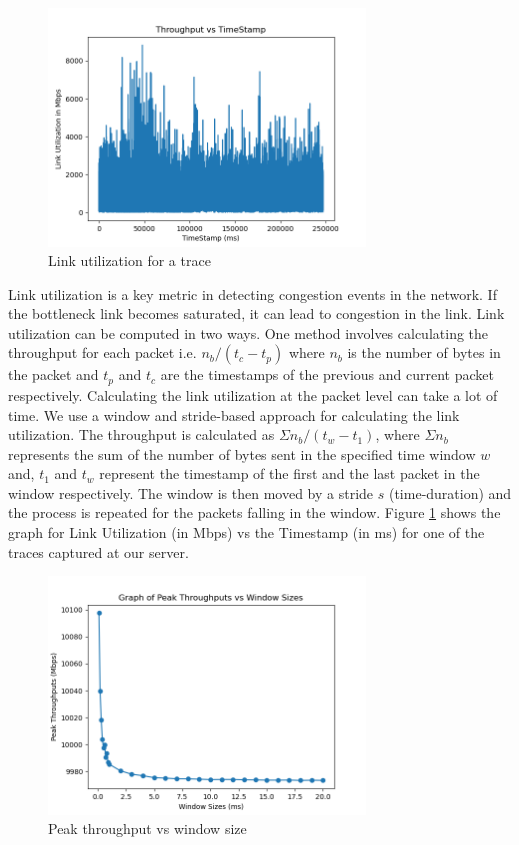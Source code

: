 \begin{figure}[t]
    \centering
        \includegraphics[width=0.75\textwidth]{Figures/link_util_600us.png}
    \caption[Link utilization for a trace]{Link utilization for a trace}
    \label{fig:linkutil}
    \bigskip
\end{figure}

Link utilization is a key metric in detecting congestion events in the network. If the bottleneck link becomes saturated, it can lead to congestion in the link. Link utilization can be computed in two ways. One method involves calculating the throughput for each packet i.e. \( n_b / (t_c - t_p) \) where \(n_b\) is the number of bytes in the packet and \(t_p\) and \(t_c\) are the timestamps of the previous and current packet respectively. Calculating the link utilization at the packet level can take a lot of time. We use a window and stride-based approach for calculating the link utilization. The throughput is calculated as \( \Sigma n_b / (t_w - t_1) \), where \( \Sigma n_b \) represents the sum of the number of bytes sent in the specified time window $w$ and, \(t_1\) and \(t_w\) represent the timestamp of the first and the last packet in the window respectively. The window is then moved by a stride $s$ (time-duration) and the process is repeated for the packets falling in the window. Figure \ref{fig:linkutil} shows the graph for Link Utilization (in Mbps) vs the Timestamp (in ms) for one of the traces captured at our server.

\begin{figure}[t]
    \centering
        \includegraphics[width=0.75\textwidth]{Figures/peak_vs_window.png}
    \caption[Peak throughput vs window size]{Peak throughput vs window size}
    \label{fig:peak}
    \bigskip
\end{figure}

